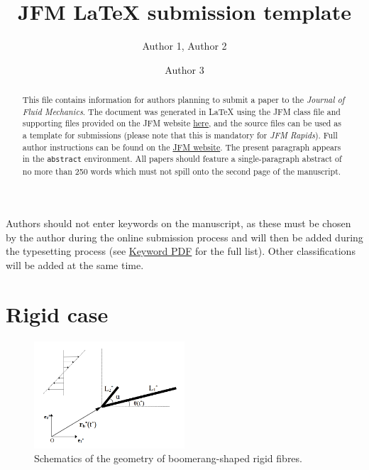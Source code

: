 \documentclass[lineno]{JFM-FLM_Au}
\title{JFM {\LaTeX} submission template}
\author{Author 1\aff{1}, Author 2\aff{1} \and Author 3\aff{2}}
\affiliation{\aff{1}Department, Institution, City, Country
\aff{2}Department, Institution, City, Country}
\begin{document}
\maketitle

\begin{abstract}
This file contains information for authors planning to submit a paper to the {\it Journal of Fluid Mechanics}. The document was generated in {\LaTeX} using the JFM class file and supporting files provided on the JFM website \href{https://www.cambridge.org/core/journals/journal-of-fluid-mechanics/information/author-instructions/preparing-your-materials}{here}, and the source files can be used as a template for submissions (please note that this is mandatory for {\it JFM Rapids}). Full author instructions can be found on the \href{https://www.cambridge.org/core/journals/journal-of-fluid-mechanics/information/author-instructions}{JFM website}. The present paragraph appears in the \verb}abstract} environment. All papers should feature a single-paragraph abstract of no more than 250 words which must not spill onto the second page of the manuscript.
\end{abstract}

\begin{keywords}
Authors should not enter keywords on the manuscript, as these must be chosen by the author during the online submission process and will then be added during the typesetting process (see \href{https://www.cambridge.org/core/services/aop-file-manager/file/61436b61ff7f3cfab749ce3a/JFM-Keywords-Sept-2021.pdf.}{Keyword PDF} for the full list).  Other classifications will be added at the same time.
\end{keywords}


\section{Rigid case}
\begin{figure}[htb]
	\begin{center}
		\includegraphics[width=0.5\textwidth]{plot/rigid_case/schematic_rigid_configuration.png}
		\caption{Schematics of the geometry of boomerang-shaped rigid fibres.}
		\label{fig:21}
	\end{center}
\end{figure}
\end{document}
